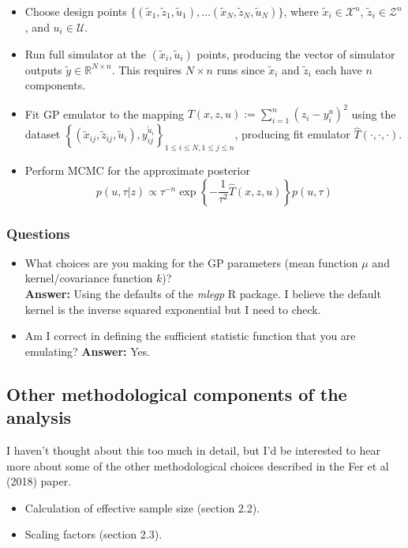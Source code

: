 \documentclass[12pt]{article}
\newcommand{\R}{\mathcal{R}}
\def\R{\mathbb{R}}
\begin{document}
\begin{itemize}
\item Choose design points $\{(\tilde{x}_1, \tilde{z}_1, \tilde{u}_1), \dots (\tilde{x}_N, \tilde{z}_N, \tilde{u}_N)\}$, where $\tilde{x}_i \in \mathcal{X}^n$, $\tilde{z}_i \in \mathcal{Z}^n$, and $u_i \in \mathcal{U}$. 
\item Run full simulator at the $(\tilde{x}_i, \tilde{u}_i)$ points, producing the vector of simulator outputs $\tilde{y} \in \R^{N \times n}$. This requires $N \times n$ runs since $\tilde{x}_i$ and $\tilde{z}_i$
each have $n$ components. 
\item Fit GP emulator to the mapping $T(x, z, u) := \sum_{i = 1}^n (z_i - y_i^{u})^2$ using the dataset $\left\{(\tilde{x}_{ij}, \tilde{z}_{ij}, \tilde{u}_i), y_{ij}^{\tilde{u}_i}\right\}_{1 \leq i \leq N, 1 \leq j \leq n}$, producing fit emulator $\hat{T}(\cdot, \cdot, \cdot)$. 
\item Perform MCMC for the approximate posterior
\[p(u, \tau|z) \propto \tau^{-n} \exp\left\{-\frac{1}{\tau^2} \hat{T}(x, z, u) \right\}p(u, \tau)\]
\end{itemize}

\subsubsection{Questions}
\begin{itemize}
\item What choices are you making for the GP parameters (mean function $\mu$ and kernel/covariance function $k$)? \\
\textbf{Answer: } Using the defaults of the \textit{mlegp} R package. I believe the default kernel is the inverse squared exponential but I need to check. 
\item Am I correct in defining the sufficient statistic function that you are emulating? 
\textbf{Answer: } Yes. 
\end{itemize}

\subsection{Other methodological components of the analysis}
I haven't thought about this too much in detail, but I'd be interested to hear more about some of the other methodological choices described in the Fer et al (2018) paper. 
\begin{itemize}
\item Calculation of effective sample size (section 2.2).
\item Scaling factors (section 2.3). 
\end{itemize}
\end{document}
